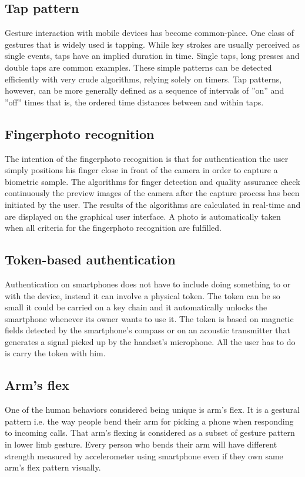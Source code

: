 \subsection{Tap pattern}
Gesture interaction with mobile devices has become common-place. One class of gestures that is widely used is tapping. While key strokes are usually perceived as single events, taps have an implied duration in time. Single taps, long presses and double taps are common examples. These simple patterns can be detected efficiently with very crude algorithms, relying solely on timers. Tap patterns, however, can be more generally defined as a sequence of intervals of ''on'' and ''off'' times that is, the ordered time distances between and within taps. \cite{marques2013under}

\subsection{Fingerphoto recognition}
The intention of the fingerphoto recognition is that for authentication the user simply positions his finger close in front of the camera in order to capture a biometric sample. The algorithms for finger detection and quality assurance check continuously the preview images of the camera after the capture process has been initiated by the user. The results of the algorithms are calculated in real-time and are displayed on the graphical user interface. A photo is automatically taken when all criteria for the fingerphoto recognition are fulfilled. \cite{stein2012fingerphoto}

\subsection{Token-based authentication}
Authentication on smartphones does not have to include doing something to or with the device, instead it can involve a physical token. The token can be so small it could be carried on a key chain and it automatically unlocks the smartphone whenever its owner wants to use it. The token is based on magnetic fields detected by the smartphone's compass or on an acoustic transmitter that generates a signal picked up by the handset's microphone. All the user has to do is carry the token with him. \cite{bojinov2011mobile}

\subsection{Arm's flex}
One of the human behaviors considered being unique is arm's flex. It is a gestural pattern i.e. the way people bend their arm for picking a phone when responding to incoming calls. That arm's flexing is considered as a subset of gesture pattern in lower limb gesture. Every person who bends their arm will have different strength measured by accelerometer using smartphone even if they own same arm's flex pattern visually.\cite{negara2012arm, srirama2011zompopo}

